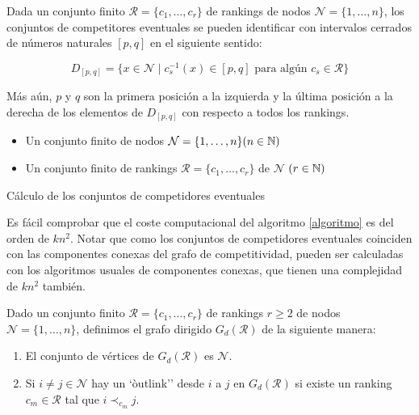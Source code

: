 \begin{teo}
Dada un conjunto finito $\mathcal{R} = \{c_1,\dots,c_r\}$ de rankings de nodos $\mathcal{N} = \{1,\dots, n\}$, los conjuntos de competitores eventuales se pueden identificar con intervalos cerrados de números naturales $[p,q]$ en el siguiente sentido:

\[ D_{[p,q]} = \{ x \in \mathcal{N} \mid c_s^{-1}(x) \in [p,q] \text{ para algún } c_s \in \mathcal{R} \} \]

Más aún, $p$ y $q$ son la primera posición a la izquierda y la última posición a la derecha de los elementos de $D_{[p,q]}$ con respecto a todos los rankings.
\end{teo}

\begin{algorithm}\label{algoritmo}
 \Input{}
 \begin{itemize}
 	\item Un conjunto finito de nodos $\mathcal{N} = \{1,\dots, n\} (n \in \mathbb{N})$
 	\item Un conjunto finito de rankings $\mathcal{R} = \{c_1,\dots,c_r\}$ de $\mathcal{N}$ $(r \in \mathbb{N})$
 \end{itemize}
 
 
 \caption{Cálculo de los conjuntos de competidores eventuales}
\end{algorithm}

Es fácil comprobar que el coste computacional del algoritmo \ref{algoritmo} es del orden de $kn^2$. Notar que como los conjuntos de competidores eventuales coinciden con las componentes conexas del grafo de competitividad, pueden ser calculadas con los algoritmos usuales de componentes conexas, que tienen una complejidad de $kn^2$ también.

\begin{defi}
Dado un conjunto finito $\mathcal{R} = \{c_1,\dots,c_r\}$ de rankings $r\geq 2$ de nodos $\mathcal{N} = \{1,\dots,n\}$, definimos el grafo dirigido $G_d(\mathcal{R})$ de la siguiente manera:
\begin{enumerate}
\item El conjunto de vértices de $G_d(\mathcal{R})$ es $\mathcal{N}$.
\item Si $i \neq j \in \mathcal{N}$ hay un `òutlink'' desde $i$ a $j$ en $G_d(\mathcal{R})$ si existe un ranking $c_m \in \mathcal{R}$ tal que $i\prec_{c_m} j$.
\end{enumerate} 
\end{defi}





